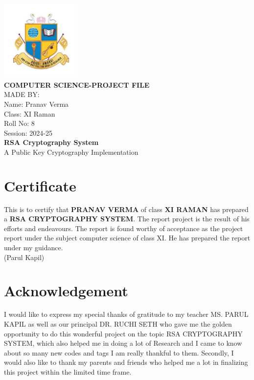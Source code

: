 \documentclass[12pt,a4paper]{report}
\begin{document}
\begin{titlepage}
\begin{center}
\includegraphics[width=0.3\textwidth]{lvis-logo.png}\\[1cm]

{\huge\textbf{COMPUTER SCIENCE-PROJECT FILE}}\\[2cm]

{\Large MADE BY:}\\[0.5cm]
{\large Name: Pranav Verma}\\[0.3cm]
{\large Class: XI Raman}\\[0.3cm]
{\large Roll No: 8}\\[0.3cm]
{\large Session: 2024-25}\\[2cm]

{\huge\textbf{RSA Cryptography System}}\\[1cm]
{\large A Public Key Cryptography Implementation}
\end{center}
\end{titlepage}

\tableofcontents
\newpage

\chapter*{Certificate}
This is to certify that \textbf{PRANAV VERMA} of class \textbf{XI RAMAN} has
prepared a \textbf{RSA CRYPTOGRAPHY SYSTEM}.
The report project is the result of his efforts and endeavours.
The report is found worthy of acceptance as the project report
under the subject computer science of class XI. He has
prepared the report under my guidance.\\[2cm]

\hfill(Parul Kapil)

\chapter*{Acknowledgement}
I would like to express my special thanks of gratitude to my
teacher MS. PARUL KAPIL as well as our principal DR. RUCHI
SETH who gave me the golden opportunity to do this wonderful
project on the topic RSA CRYPTOGRAPHY SYSTEM,
which also helped me in doing a lot of Research and I came to
know about so many new codes and tags I am really thankful to
them. Secondly, I would also like to thank my parents and
friends who helped me a lot in finalizing this project within the
limited time frame.
\end{document}
